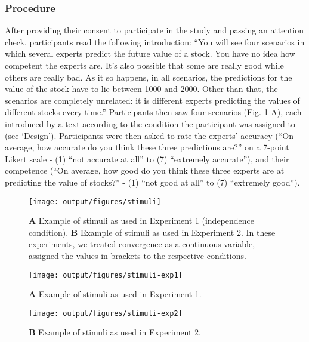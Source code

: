 \documentclass[
  doc,floatsintext]{apa6}
\begin{document}
\hypertarget{procedure}{%
\subsubsection{Procedure}\label{procedure}}

After providing their consent to participate in the study and passing an attention check, participants read the following introduction: ``You will see four scenarios in which several experts predict the future value of a stock. You have no idea how competent the experts are. It's also possible that some are really good while others are really bad. As it so happens, in all scenarios, the predictions for the value of the stock have to lie between 1000 and 2000. Other than that, the scenarios are completely unrelated: it is different experts predicting the values of different stocks every time.'' Participants then saw four scenarios (Fig. \ref{fig:stimuli} A), each introduced by a text according to the condition the participant was assigned to (see `Design'). Participants were then asked to rate the experts' accuracy (``On average, how accurate do you think these three predictions are?'' on a 7-point Likert scale - (1) ``not accurate at all'' to (7) ``extremely accurate''), and their competence (``On average, how good do you think these three experts are at predicting the value of stocks?'' - (1) ``not good at all'' to (7) ``extremely good'').



\begin{figure}

\texttt{[image: output/figures/stimuli]} \hfill{}

\caption{\textbf{A} Example of stimuli as used in Experiment 1 (independence condition). \textbf{B} Example of stimuli as used in Experiment 2. In these experiments, we treated convergence as a continuous variable, assigned the values in brackets to the respective conditions.}\label{fig:stimuli}
\end{figure}



\begin{figure}

\texttt{[image: output/figures/stimuli-exp1]} \hfill{}

\caption{\textbf{A} Example of stimuli as used in Experiment 1.}\label{fig:stimuli-exp1}
\end{figure}



\begin{figure}

\texttt{[image: output/figures/stimuli-exp2]} \hfill{}

\caption{\textbf{B} Example of stimuli as used in Experiment 2.}\label{fig:stimuli-exp2}
\end{figure}
\end{document}
